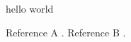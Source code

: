 \documentclass[prl]{revtex4-1}
\begin{document}
hello world

Reference A \cite{Czarnik:2015}.
Reference B \cite{Czarnik:2012}.


\end{document}
